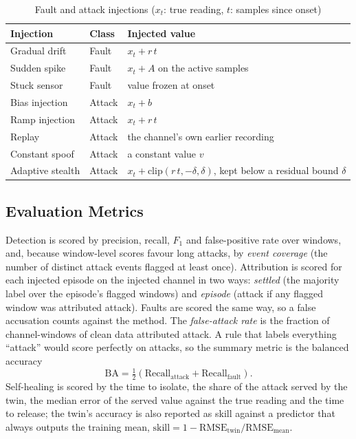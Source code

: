 \documentclass[11pt,a4paper]{article}
\begin{document}
\begin{table}[H]
\centering
\caption{Fault and attack injections ($x_t$: true reading, $t$: samples since onset)}
\label{tab:inject}
\small
\begin{tabular}{@{}l l l@{}}
\toprule
\textbf{Injection} & \textbf{Class} & \textbf{Injected value} \\
\midrule
Gradual drift & Fault & $x_t + r\,t$ \\
Sudden spike & Fault & $x_t + A$ on the active samples \\
Stuck sensor & Fault & value frozen at onset \\
Bias injection & Attack & $x_t + b$ \\
Ramp injection & Attack & $x_t + r\,t$ \\
Replay & Attack & the channel's own earlier recording \\
Constant spoof & Attack & a constant value $v$ \\
Adaptive stealth & Attack & $x_t + \mathrm{clip}(r\,t, -\delta, \delta)$, kept below a residual bound $\delta$ \\
\bottomrule
\end{tabular}
\end{table}

\subsection{Evaluation Metrics}

Detection is scored by precision, recall, $F_1$ and false-positive rate over windows, and, because window-level scores favour long attacks, by \emph{event coverage} (the number of distinct attack events flagged at least once). Attribution is scored for each injected episode on the injected channel in two ways: \emph{settled} (the majority label over the episode's flagged windows) and \emph{episode} (attack if any flagged window was attributed attack). Faults are scored the same way, so a false accusation counts against the method. The \emph{false-attack rate} is the fraction of channel-windows of clean data attributed attack. A rule that labels everything ``attack'' would score perfectly on attacks, so the summary metric is the balanced accuracy
\begin{equation}
\mathrm{BA} = \tfrac{1}{2}\left(\mathrm{Recall}_{\mathrm{attack}} + \mathrm{Recall}_{\mathrm{fault}}\right).
\end{equation}
Self-healing is scored by the time to isolate, the share of the attack served by the twin, the median error of the served value against the true reading and the time to release; the twin's accuracy is also reported as skill against a predictor that always outputs the training mean, $\mathrm{skill} = 1 - \mathrm{RMSE}_{\mathrm{twin}}/\mathrm{RMSE}_{\mathrm{mean}}$.
\end{document}
